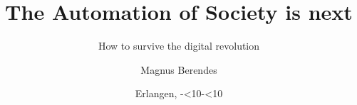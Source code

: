%

\usepackage{ifdraft}
\usepackage[T1]{fontenc}
\usepackage[utf8]{inputenc}
\usepackage[ngerman]{babel}
\usepackage[babel,german=quotes]{csquotes}
\usepackage{lmodern}
\usepackage{graphicx}
\usepackage{pgf}

\usepackage{xcolor}
\usepackage{relsize}

\usepackage{pgfplotstable}
\usepackage{pgfplots}


	

\def\ifmonospace{\ifdim\fontdimen3\font=0pt }

\newcommand{\quoteframe}[3]
{
	\begin{frame}
		\begin{quote}
		\Huge#3
		\end{quote}
		\vskip0pt plus 1filll
		\begin{minipage}{\textwidth}
			\begin{flushright}
			\LARGE#1
			\\
			\normalsize#2
			\end{flushright}
		\end{minipage}
	\end{frame}
}



\title[Automation of Society is next]{The Automation of Society is next}
\subtitle{How to survive the digital revolution}
\author{Magnus Berendes}
\date{Erlangen, \the\year-\ifnum\month<10\fi\the\month-\ifnum\day<10\fi\the\day}
\institute{}











